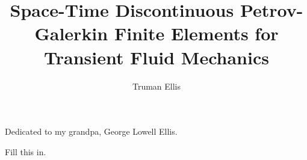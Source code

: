\documentclass[12pt]{report} %
\author{Truman Ellis}  	%
\title{Space-Time Discontinuous Petrov-Galerkin Finite Elements for Transient Fluid Mechanics}
\begin{document}
\copyrightpage          %


%
%
%
\commcertpage           %

\titlepage  %



%
\begin{dedication}
%
Dedicated to my grandpa, George Lowell Ellis.
\end{dedication}


\begin{acknowledgments}		%
%
Fill this in.





\end{acknowledgments}
\end{document}
